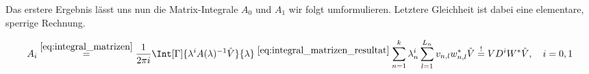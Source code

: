 Das erstere Ergebnis lässt uns nun die Matrix-Integrale $A_0$ und $A_1$ wir folgt umformulieren.
Letztere Gleichheit ist dabei eine elementare, sperrige Rechnung.

\begin{align} \label{eq:integral_matrizen_resultat_compact}
    A_i
    \stackrel
    {
        \eqref{eq:integral_matrizen}
    }{=}
    \frac{1}{2 \pi i}
    \Int[\Gamma]
    {
        \lambda^i
        A(\lambda)^{-1}
        \hat V
    }{\lambda}
    \stackrel
    {
        \eqref{eq:integral_matrizen_resultat}
    }{}
    \sum_{n=1}^k
        \lambda_n^i
        \sum_{l=1}^{L_n}
            v_{n, l} w_{n, l}^\ast
    \hat V
    \stackrel{!}{=}
    V D^i W^\ast \hat V,
    \quad
    i = 0, 1
\end{align}
